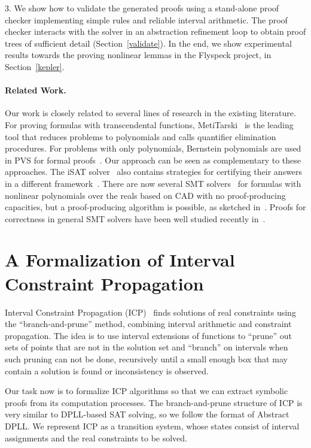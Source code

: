\documentclass{llncs}
\begin{document}
3. We show how to validate the generated proofs using a stand-alone proof checker implementing simple rules and reliable interval arithmetic. The proof checker interacts with the solver in an abstraction refinement loop to obtain proof trees of sufficient detail (Section~\ref{validate}). In the end, we show experimental results towards the proving nonlinear lemmas in the Flyspeck project, in Section~\ref{kepler}.

\paragraph{Related Work.} Our work is closely related to several lines
of research in the existing literature. For proving formulas with
transcendental functions,
MetiTarski~\cite{DBLP:conf/itp/Paulson12,DBLP:journals/jar/AkbarpourP10,DBLP:conf/aisc/PassmorePM12}
is the leading tool that reduces problems to
polynomials and calls quantifier elimination procedures. For problems with only
polynomials, Bernstein polynomials are used in PVS for formal
proofs~\cite{MN12}. Our approach can be seen as complementary to these
approaches. The iSAT solver~\cite{HySAT} also contains strategies for certifying
their answers in a different framework~\cite{DBLP:conf/ddecs/KupferschmidBTF11}.
There are now several SMT
solvers~\cite{DBLP:conf/cade/JovanovicM12,DBLP:conf/mkm/PassmoreJ09} for formulas with nonlinear polynomials over
the reals based on CAD with no proof-producing capacities, but a proof-producing
algorithm is possible, as sketched in~\cite{DBLP:conf/cade/McLaughlinH05}. Proofs for
correctness in general SMT solvers have been well studied
 recently in~\cite{DBLP:journals/fmsd/StumpORHT13}.

\section{A Formalization of Interval Constraint Propagation}\label{formalization}

Interval Constraint Propagation (ICP)~\cite{handbookICP} finds
solutions of real constraints using the ``branch-and-prune'' method, combining
interval arithmetic and constraint propagation. The idea is to use interval
extensions of functions to ``prune'' out sets of points that are not in the
solution set and ``branch'' on intervals when
such pruning can not be done, recursively until a small enough box
that may contain a solution is found or inconsistency is observed.

Our task now is to formalize ICP algorithms
so that we can extract symbolic proofs from its computation processes. The
branch-and-prune structure of ICP is very similar to DPLL-based SAT solving, so
we follow the format of Abstract DPLL. We represent ICP
as a transition system, whose states consist of interval assignments and the
real constraints to be solved.
\end{document}
